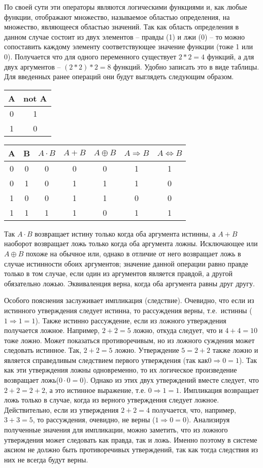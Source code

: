 \documentclass[a4paper, fleqn]{article}
\begin{document}
	По своей сути эти операторы являются логическими функциями и, как любые функции, отображают множество, называемое областью определения,  на множество, являющееся областью значений. Так как область определения в данном случае состоит из двух элементов -- правды (1) и лжи (0) -- то можно сопоставить каждому элементу соответствующее значение функции (тоже 1 или 0). Получается что для одного переменного существует $2*2=4$ функций, а для двух аргументов -- $(2*2)*2=8$ функций. Удобно записать это в виде таблицы. Для введенных ранее операций они будут выглядеть следующим образом.
	
	\begin{tabular}{c|c}
		A&  not A\\ 
		\hline  
		0&  1\\ 
		1&  0\\  
	\end{tabular} \qquad \qquad
	\begin{tabular}{cc|c|c|c|c|c}
		A&  B&  $A \cdot B$&  $A+B$&  $A \oplus B$& $A\Rightarrow B$&  $A \Leftrightarrow B$\\ 
		\hline
		0&  0&  0&  0&  0&	1&  1\\ 
		0&  1&  0&  1&  1&	1&  0\\ 
		1&  0&  0&  1&  1&	0&  0\\ 
		1&  1&  1&  1&  0&	1&  1\\ 
	\end{tabular} 
	
	Так $A \cdot B$ возвращает истину только когда оба аргумента истинны, а $A+B$ наоборот возвращает ложь только когда оба аргумента ложны. Исключающее или $A \oplus B$ похоже на обычное или, однако в отличие от него возвращает ложь в случае истинности обоих аргументов; значение данной операции равно правде только в том случае, если один из аргументов является правдой, а другой обязательно ложью. 
	Эквиваленция верна, когда оба аргумента равны друг другу.
	
	Особого пояснения заслуживает импликация (следствие). Очевидно, что если из истинного утверждения следует истинна, то рассуждения верны, т.е.~истинны ($1\Rightarrow 1 = 1$). Также истинно рассуждение, если из ложного утверждения получается ложное. Например, $2+2 = 5$ ложно, откуда следует, что и $4+4=10$ тоже ложно. Может показаться противоречивым, но из ложного суждения может следовать истинное. Так, $2+2 = 5$ ложно. Утверждение $5=2+2$ также ложно и является справедливым следствием первого утверждения (так как$0 \Rightarrow 0 = 1$). Так как эти утверждения ложны одновременно, то их логическое произведение возвращает ложь($0\cdot 0 = 0$). Однако из этих двух утверждений вместе следует, что $2+2 = 2+2$, а это истинное выражение, т.е. $0 \Rightarrow 1 = 1$. Импликация возвращает ложь только в случае, когда из верного утверждения следует ложное. Действительно, если из утверждения $2+2=4$ получается, что, например, $3+3=5$, то рассуждения, очевидно, не верны ($1 \Rightarrow 0 = 0$). Анализируя полученные значения для импликации, можно заметить, что из ложного утверждения может следовать как правда, так и ложь. Именно поэтому в системе аксиом не должно быть противоречивых утверждений, так как тогда следствия из них не всегда будут верны. 
	
\end{document}
